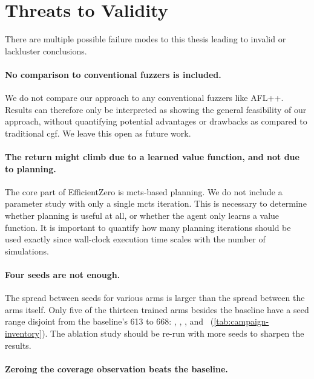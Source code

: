 
\section{Threats to Validity}\label{sec:discussion-threats}

There are multiple possible failure modes to this thesis leading to invalid or lackluster conclusions.

\paragraph{No comparison to conventional fuzzers is included.}
We do not compare our approach to any conventional fuzzers like AFL++.
Results can therefore only be interpreted as showing the general feasibility of our approach,
without quantifying potential advantages or drawbacks as compared to traditional \gls{cgf}.
We leave this open as future work.

\paragraph{The return might climb due to a learned value function, and not due to planning.}
The core part of EfficientZero is \gls{mcts}-based planning.
We do not include a parameter study with only a single \gls{mcts} iteration.
This is necessary to determine whether planning is useful at all, or whether the
agent only learns a value function.
It is important to quantify how many planning iterations should be used exactly since wall-clock
execution time scales with the number of simulations.

\paragraph{Four seeds are not enough.}
The spread between seeds for various arms is larger than the spread between the arms
itself.
Only five of the thirteen trained arms besides the baseline have a
seed range disjoint from the baseline's \num{613} to \num{668}:
, , ,  and
~(\cref{tab:campaign-inventory}).
The ablation study should be re-run with more seeds to sharpen the results.

\paragraph{Zeroing the coverage observation beats the baseline.}

